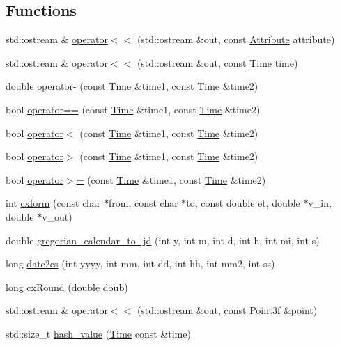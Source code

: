 \subsection*{Functions}
\begin{DoxyCompactItemize}
\item 
std\-::ostream \& \hyperlink{namespaceccmc_ad811f4e9ac8644fea4054b81aabbb072}{operator$<$$<$} (std\-::ostream \&out, const \hyperlink{classccmc_1_1_attribute}{Attribute} attribute)
\item 
std\-::ostream \& \hyperlink{namespaceccmc_ae583b649601da0108ffe024b315cc131}{operator$<$$<$} (std\-::ostream \&out, const \hyperlink{classccmc_1_1_time}{Time} time)
\item 
double \hyperlink{namespaceccmc_a56b029527268b2a7dc0152296e790311}{operator-\/} (const \hyperlink{classccmc_1_1_time}{Time} \&time1, const \hyperlink{classccmc_1_1_time}{Time} \&time2)
\item 
bool \hyperlink{namespaceccmc_a3fce93a0ef72e32c4565e23abdb5e19b}{operator==} (const \hyperlink{classccmc_1_1_time}{Time} \&time1, const \hyperlink{classccmc_1_1_time}{Time} \&time2)
\item 
bool \hyperlink{namespaceccmc_ab38851472be407f010420ed9af48f30b}{operator$<$} (const \hyperlink{classccmc_1_1_time}{Time} \&time1, const \hyperlink{classccmc_1_1_time}{Time} \&time2)
\item 
bool \hyperlink{namespaceccmc_aa8187280256650785ed2835b7ee12574}{operator$>$} (const \hyperlink{classccmc_1_1_time}{Time} \&time1, const \hyperlink{classccmc_1_1_time}{Time} \&time2)
\item 
bool \hyperlink{namespaceccmc_a9d79baffce54b78a54946d6a76743c0b}{operator$>$=} (const \hyperlink{classccmc_1_1_time}{Time} \&time1, const \hyperlink{classccmc_1_1_time}{Time} \&time2)
\item 
int \hyperlink{namespaceccmc_a89959a8566a58d1e6c000d742304be1b}{cxform} (const char $\ast$from, const char $\ast$to, const double et, double $\ast$v\-\_\-in, double $\ast$v\-\_\-out)
\item 
double \hyperlink{namespaceccmc_ae9b36fc97f95279e8815455b796fb78f}{gregorian\-\_\-calendar\-\_\-to\-\_\-jd} (int y, int m, int d, int h, int mi, int s)
\item 
long \hyperlink{namespaceccmc_a2bcda52133fe790c98ff1e09e0d8feef}{date2es} (int yyyy, int mm, int dd, int hh, int mm2, int ss)
\item 
long \hyperlink{namespaceccmc_acbeec2fb0bdcdbe669f213d20cb5d3ac}{cx\-Round} (double doub)
\item 
std\-::ostream \& \hyperlink{namespaceccmc_a447a43508de96a63d12aae7c85aaa06b}{operator$<$$<$} (std\-::ostream \&out, const \hyperlink{classccmc_1_1_point3f}{Point3f} \&point)
\item 
std\-::size\-\_\-t \hyperlink{namespaceccmc_a12a62484d27726b55814a116018d6434}{hash\-\_\-value} (\hyperlink{classccmc_1_1_time}{Time} const \&time)
\end{DoxyCompactItemize}


